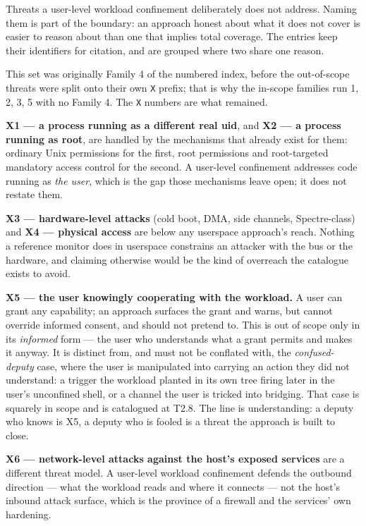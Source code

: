 Threats a user-level workload confinement deliberately does not address.
Naming them is part of the boundary: an approach honest about what it
does not cover is easier to reason about than one that implies total
coverage. The entries keep their identifiers for citation, and are
grouped where two share one reason.

This set was originally Family 4 of the numbered index, before the
out-of-scope threats were split onto their own \texttt{X} prefix; that
is why the in-scope families run 1, 2, 3, 5 with no Family 4. The
\texttt{X} numbers are what remained.

\textbf{X1 --- a process running as a different real uid}, and
\textbf{X2 --- a process running as root}, are handled by the mechanisms
that already exist for them: ordinary Unix permissions for the first,
root permissions and root-targeted mandatory access control for the
second. A user-level confinement addresses code running as \emph{the
user}, which is the gap those mechanisms leave open; it does not restate
them.

\textbf{X3 --- hardware-level attacks} (cold boot, DMA, side channels,
Spectre-class) and \textbf{X4 --- physical access} are below any
userspace approach's reach. Nothing a reference monitor does in
userspace constrains an attacker with the bus or the hardware, and
claiming otherwise would be the kind of overreach the catalogue exists
to avoid.

\textbf{X5 --- the user knowingly cooperating with the workload.} A user
can grant any capability; an approach surfaces the grant and warns, but
cannot override informed consent, and should not pretend to. This is out
of scope only in its \emph{informed} form --- the user who understands
what a grant permits and makes it anyway. It is distinct from, and must
not be conflated with, the \emph{confused-deputy} case, where the user
is manipulated into carrying an action they did not understand: a
trigger the workload planted in its own tree firing later in the user's
unconfined shell, or a channel the user is tricked into bridging. That
case is squarely in scope and is catalogued at T2.8. The line is
understanding: a deputy who knows is X5, a deputy who is fooled is a
threat the approach is built to close.

\textbf{X6 --- network-level attacks against the host's exposed
services} are a different threat model. A user-level workload
confinement defends the outbound direction --- what the workload reads
and where it connects --- not the host's inbound attack surface, which
is the province of a firewall and the services' own hardening.

